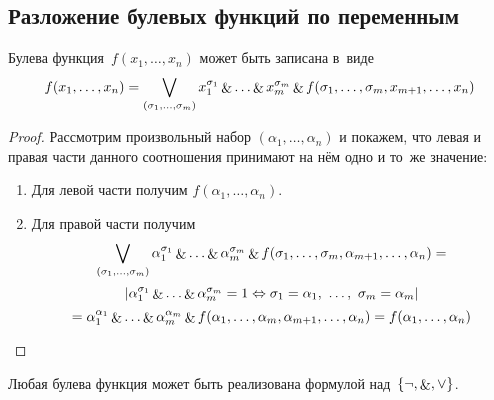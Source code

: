 \subsection{Разложение булевых функций по переменным}
\begin{theorem}
Булева функция~$f(x_1, \ldots, x_n)$ может быть записана в~виде
\begin{equation*}
f(x_1, \ldots, x_n) = \bigvee_{(\sigma_1, \ldots, \sigma_m)}
x_1^{\sigma_1} \mathop{\&} \ldots \mathop{\&} x_m^{\sigma_m} \mathop{\&} f(\sigma_1, \ldots, \sigma_m, x_{m+1}, \ldots, x_n)
\end{equation*}
\end{theorem}
\begin{proof}
Рассмотрим произвольный набор $(\alpha_1, \ldots, \alpha_n)$ и покажем, что левая и правая части данного соотношения принимают на нём одно и то~же значение:
\begin{enumerate}
	\item Для левой части получим $f(\alpha_1, \ldots, \alpha_n)$.
	\item Для правой части получим
	\begin{equation*}
	\bigvee_{(\sigma_1, \ldots, \sigma_m)}
	\alpha_1^{\sigma_1} \mathop{\&} \ldots \mathop{\&} \alpha_m^{\sigma_m} \mathop{\&} f(\sigma_1, \ldots, \sigma_m, \alpha_{m+1}, \ldots, \alpha_n) =
	\end{equation*}
	\begin{equation*}
	\left| \alpha_1^{\sigma_1} \mathop{\&} \ldots \mathop{\&} \alpha_m^{\sigma_m} = 1 \Leftrightarrow
	\sigma_1 = \alpha_1, \ \ldots, \ \sigma_m = \alpha_m \right|
	\end{equation*}
	\begin{equation*}
	= \alpha_1^{\alpha_1} \mathop{\&} \ldots \mathop{\&} \alpha_m^{\alpha_m} \mathop{\&} f(\alpha_1, \ldots, \alpha_m, \alpha_{m+1}, \ldots, \alpha_n)
	= f(\alpha_1, \ldots, \alpha_n)
	\end{equation*}
\end{enumerate}
\end{proof}

\begin{consequent}
Любая булева функция может быть реализована формулой над~$\{ \neg, \mathop{\&}, \lor \}$.
\end{consequent}